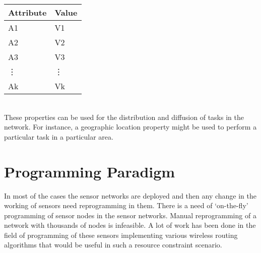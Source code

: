 \documentclass[twocolumn]{article}
\begin{document}
\begin{tabular}{|l|l|}
\hline
Attribute & Value \\
\hline
A1 & V1 \\
A2 & V2 \\
A3 & V3 \\
\vdots & \vdots \\
Ak & Vk \\
\hline
\end{tabular} \\

These properties can be used for the distribution and diffusion of tasks in the network. For instance, a geographic location property might be used to perform a particular task in a particular area.\\


\section{Programming Paradigm}

In most of the cases the sensor networks are deployed and then any change in the working of sensors need reprogramming in them. There is a need of ‘on-the-fly’ programming of sensor nodes in the sensor networks. Manual reprogramming of a network with thousands of nodes is infeasible. A lot of work has been done in the field of programming of these sensors implementing various wireless routing algorithms that would be useful in such a resource constraint scenario.
\end{document}
